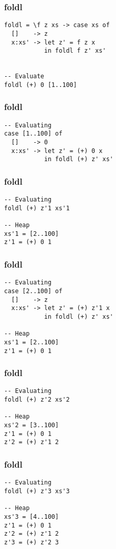 \documentclass{beamer}
\begin{document}
\begin{frame}[fragile]
\frametitle{foldl}
\begin{verbatim}
foldl = \f z xs -> case xs of
  []    -> z
  x:xs' -> let z' = f z x
           in foldl f z' xs'


-- Evaluate
foldl (+) 0 [1..100]           
\end{verbatim}
\end{frame}

\begin{frame}[t,fragile]
\frametitle{foldl}
\begin{verbatim}
-- Evaluating
case [1..100] of
  []    -> 0
  x:xs' -> let z' = (+) 0 x
           in foldl (+) z' xs'
\end{verbatim}
\end{frame}

\begin{frame}[t,fragile]
\frametitle{foldl}
\begin{verbatim}
-- Evaluating
foldl (+) z'1 xs'1

-- Heap
xs'1 = [2..100]
z'1 = (+) 0 1
\end{verbatim}
\end{frame}

\begin{frame}[t,fragile]
\frametitle{foldl}
\begin{verbatim}
-- Evaluating
case [2..100] of
  []    -> z
  x:xs' -> let z' = (+) z'1 x
           in foldl (+) z' xs'

-- Heap
xs'1 = [2..100]
z'1 = (+) 0 1
\end{verbatim}
\end{frame}

\begin{frame}[t,fragile]
\frametitle{foldl}
\begin{verbatim}
-- Evaluating
foldl (+) z'2 xs'2

-- Heap
xs'2 = [3..100]
z'1 = (+) 0 1
z'2 = (+) z'1 2
\end{verbatim}
\end{frame}

\begin{frame}[t,fragile]
\frametitle{foldl}
\begin{verbatim}
-- Evaluating
foldl (+) z'3 xs'3

-- Heap
xs'3 = [4..100]
z'1 = (+) 0 1
z'2 = (+) z'1 2
z'3 = (+) z'2 3
\end{verbatim}
\end{frame}
\end{document}
